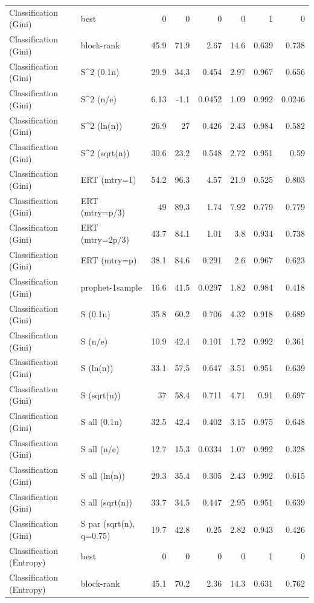 \begin{table}[t]
\begin{tabular}{llrrrrrr}
Classification (Gini) & best & 0 & 0 & 0 & 0 & 1 & 0 \\
Classification (Gini) & block-rank & 45.9 & 71.9 & 2.67 & 14.6 & 0.639 & 0.738 \\
Classification (Gini) & S^2 (0.1n) & 29.9 & 34.3 & 0.454 & 2.97 & 0.967 & 0.656 \\
Classification (Gini) & S^2 (n/e) & 6.13 & -1.1 & 0.0452 & 1.09 & 0.992 & 0.0246 \\
Classification (Gini) & S^2 (ln(n)) & 26.9 & 27 & 0.426 & 2.43 & 0.984 & 0.582 \\
Classification (Gini) & S^2 (sqrt(n)) & 30.6 & 23.2 & 0.548 & 2.72 & 0.951 & 0.59 \\
Classification (Gini) & ERT (mtry=1) & 54.2 & 96.3 & 4.57 & 21.9 & 0.525 & 0.803 \\
Classification (Gini) & ERT (mtry=p/3) & 49 & 89.3 & 1.74 & 7.92 & 0.779 & 0.779 \\
Classification (Gini) & ERT (mtry=2p/3) & 43.7 & 84.1 & 1.01 & 3.8 & 0.934 & 0.738 \\
Classification (Gini) & ERT (mtry=p) & 38.1 & 84.6 & 0.291 & 2.6 & 0.967 & 0.623 \\
Classification (Gini) & prophet-1sample & 16.6 & 41.5 & 0.0297 & 1.82 & 0.984 & 0.418 \\
Classification (Gini) & S (0.1n) & 35.8 & 60.2 & 0.706 & 4.32 & 0.918 & 0.689 \\
Classification (Gini) & S (n/e) & 10.9 & 42.4 & 0.101 & 1.72 & 0.992 & 0.361 \\
Classification (Gini) & S (ln(n)) & 33.1 & 57.5 & 0.647 & 3.51 & 0.951 & 0.639 \\
Classification (Gini) & S (sqrt(n)) & 37 & 58.4 & 0.711 & 4.71 & 0.91 & 0.697 \\
Classification (Gini) & S all (0.1n) & 32.5 & 42.4 & 0.402 & 3.15 & 0.975 & 0.648 \\
Classification (Gini) & S all (n/e) & 12.7 & 15.3 & 0.0334 & 1.07 & 0.992 & 0.328 \\
Classification (Gini) & S all (ln(n)) & 29.3 & 35.4 & 0.305 & 2.43 & 0.992 & 0.615 \\
Classification (Gini) & S all (sqrt(n)) & 33.7 & 34.5 & 0.447 & 2.95 & 0.951 & 0.639 \\
Classification (Gini) & S par (sqrt(n), q=0.75) & 19.7 & 42.8 & 0.25 & 2.82 & 0.943 & 0.426 \\
Classification (Entropy) & best & 0 & 0 & 0 & 0 & 1 & 0 \\
Classification (Entropy) & block-rank & 45.1 & 70.2 & 2.36 & 14.3 & 0.631 & 0.762 \\

\end{tabular}
\end{table}

